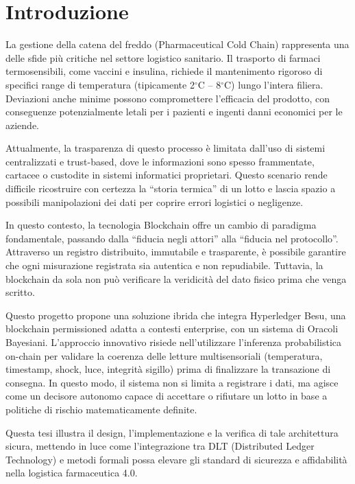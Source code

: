 \chapter{Introduzione}

La gestione della catena del freddo (Pharmaceutical Cold Chain) rappresenta una delle sfide più critiche nel settore logistico sanitario. Il trasporto di farmaci termosensibili, come vaccini e insulina, richiede il mantenimento rigoroso di specifici range di temperatura (tipicamente 2$^\circ$C -- 8$^\circ$C) lungo l'intera filiera. Deviazioni anche minime possono compromettere l'efficacia del prodotto, con conseguenze potenzialmente letali per i pazienti e ingenti danni economici per le aziende.

Attualmente, la trasparenza di questo processo è limitata dall'uso di sistemi centralizzati e trust-based, dove le informazioni sono spesso frammentate, cartacee o custodite in sistemi informatici proprietari. Questo scenario rende difficile ricostruire con certezza la ``storia termica'' di un lotto e lascia spazio a possibili manipolazioni dei dati per coprire errori logistici o negligenze.

In questo contesto, la tecnologia Blockchain offre un cambio di paradigma fondamentale, passando dalla ``fiducia negli attori'' alla ``fiducia nel protocollo''. Attraverso un registro distribuito, immutabile e trasparente, è possibile garantire che ogni misurazione registrata sia autentica e non repudiabile. Tuttavia, la blockchain da sola non può verificare la veridicità del dato fisico prima che venga scritto.

Questo progetto propone una soluzione ibrida che integra Hyperledger Besu, una blockchain permissioned adatta a contesti enterprise, con un sistema di Oracoli Bayesiani. L'approccio innovativo risiede nell'utilizzare l'inferenza probabilistica on-chain per validare la coerenza delle letture multisensoriali (temperatura, timestamp, shock, luce, integrità sigillo) prima di finalizzare la transazione di consegna. In questo modo, il sistema non si limita a registrare i dati, ma agisce come un decisore autonomo capace di accettare o rifiutare un lotto in base a politiche di rischio matematicamente definite.

Questa tesi illustra il design, l'implementazione e la verifica di tale architettura sicura, mettendo in luce come l'integrazione tra DLT (Distributed Ledger Technology) e metodi formali possa elevare gli standard di sicurezza e affidabilità nella logistica farmaceutica 4.0.

